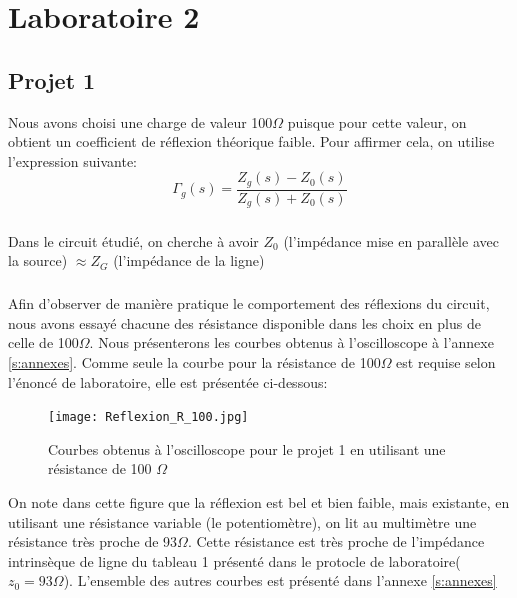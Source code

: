 



\label{s:experimentation}
\chapter{Laboratoire 2}
\section{Projet 1}
Nous avons choisi une charge de valeur 100$\Omega$ puisque pour cette valeur, on obtient un coefficient de réflexion théorique faible. Pour affirmer cela, on utilise l'expression suivante:
\begin{equation}
\Gamma_g (s) = \frac{Z_g(s) - Z_0(s)}{Z_g(s) + Z_0(s)}\label{eq:reflex}
 \end{equation} 

\paragraph{}Dans le circuit étudié, on cherche à avoir $Z_0$ (l'impédance mise en parallèle avec la source) $\approx Z_G$ (l'impédance de la ligne)

\paragraph{}Afin d'observer de manière pratique le comportement des réflexions du circuit, nous avons essayé chacune des résistance disponible dans les choix en plus de celle de 100$\Omega$. Nous présenterons les courbes obtenus à l'oscilloscope à l'annexe \ref{s:annexes}. Comme seule la courbe pour la résistance de 100$\Omega$ est requise selon l'énoncé de laboratoire, elle est présentée ci-dessous:

\begin{figure}[htb]
\begin{center}
\texttt{[image: Reflexion\_R\_100.jpg]}
\caption{Courbes obtenus à l'oscilloscope pour le projet 1 en utilisant une résistance de 100 $\Omega$}
\label{Reflexion_R_100}
\end{center}
\end{figure}

On note dans cette figure que la réflexion est bel et bien faible, mais existante, en utilisant une résistance variable (le potentiomètre), on lit au multimètre une résistance très proche de 93$\Omega$. Cette résistance est très proche de l'impédance intrinsèque de ligne du tableau 1 présenté dans le protocle de laboratoire( $z_0 = 93\Omega$). L'ensemble des autres courbes est présenté dans l'annexe \ref{s:annexes}


